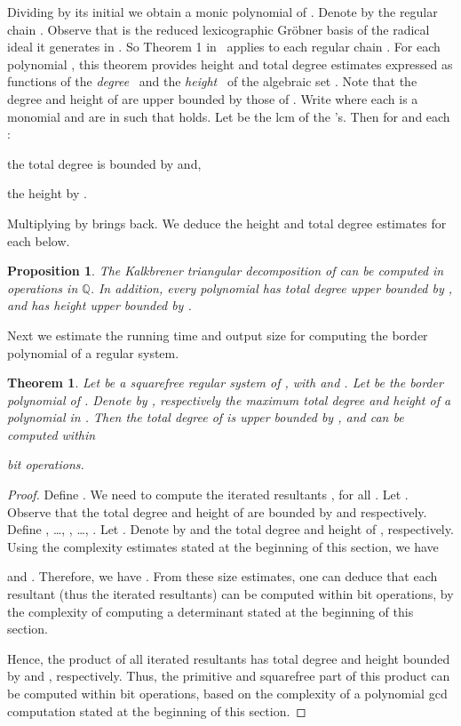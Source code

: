 \documentclass{sig-alternate}
\def\Q {\ensuremath{\mathbb{Q}}}
\newtheorem{Theorem}{Theorem}
\newtheorem{Proposition}{Proposition}
\def\Q {\ensuremath{\mathbb{Q}}}
\begin{document}
Dividing  by its initial
we obtain a monic polynomial  
of .
Denote by  the regular chain .
Observe that  is the 
reduced lexicographic Gr\"obner basis of the radical ideal 
it generates in 
.
So Theorem 1 in~\cite{DaSKac09} applies to each regular chain .
For each polynomial , this theorem provides 
height and total degree estimates
expressed as functions of the {\em degree}~\cite{BCSL97}  and
the {\em height}~\cite{pph3,KrPaSo01} of the algebraic set
.
Note that the degree and height of
 are upper bounded by those of .
Write 
where each  is a monomial
and  are in 
 such that 
 holds.
Let  be the lcm of the 's.
Then for  and each :
\begin{itemizeshort}
	\item the total degree is bounded by  and,
	\item  the height 
           by .
\end{itemizeshort}
Multiplying  by 
brings  back. We deduce
the height and total degree 
estimates for each  below.

\begin{Proposition}
\label{Prop:foobar}
The Kalkbrener triangular decomposition  
of  can be computed in
 operations in {\Q}.
In addition,  every polynomial 
has total degree upper bounded by ,
and has height upper bounded by
.
\end{Proposition}

Next we estimate the running time
and output size for computing the border polynomial
of a regular system.
\begin{Theorem}
\label{thm: complexity-bp}
Let  be a squarefree regular system of ,
with  and .
Let  be the border polynomial of .
Denote by ,  
respectively the maximum total degree and height
of a polynomial in .
Then the total degree of  is upper bounded by 
, 
and  can be computed within
 
bit operations.
\end{Theorem}
\begin{proof}
Define .
We need to compute the  iterated resultants ,
for all .
Let .
Observe that the total degree and height of 
are  bounded by 
 and  respectively.
Define 
, \ldots, 
, \ldots,
.
Let .
Denote by  and   the total degree and
height of , respectively.
Using the complexity estimates stated at the beginning 
of this section, we have
 
and
.
Therefore, we have 
.
From these size estimates, one can deduce that each resultant  
(thus the iterated resultants) can be computed within 
 bit operations, 
by the complexity of computing a determinant 
stated at the beginning of this section.

Hence, the product of all iterated resultants has total
degree and height bounded
by  
and
, respectively. 
Thus, the primitive and squarefree part of this product 
can be computed within 
 bit operations, 
based on the complexity of  a polynomial
gcd computation stated at the beginning of this section.
\end{proof}
\end{document}
